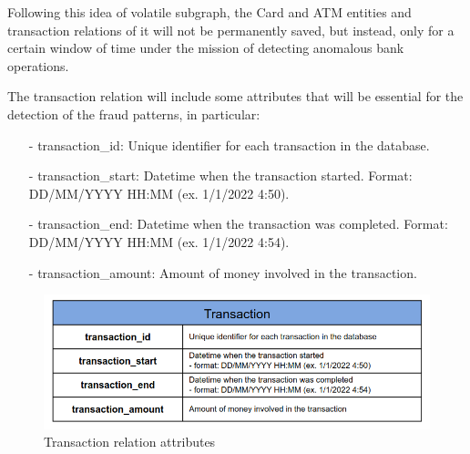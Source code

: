 \documentclass{article}
\begin{document}
Following this idea of volatile subgraph, the Card and ATM entities and transaction relations of it will not be permanently saved, but instead, only for a certain window of time under the mission of detecting anomalous bank operations. 

The transaction relation will include some attributes that will be essential for the detection of the fraud patterns, in particular:

\begin{itemize}
\item[-] transaction\_id: Unique identifier for each transaction in the database.
\item[-] transaction\_start: Datetime when the transaction started. Format: DD/MM/YYYY HH:MM (ex. 1/1/2022 4:50).
\item[-] transaction\_end: Datetime when the transaction was completed. Format: DD/MM/YYYY HH:MM (ex. 1/1/2022 4:54).
\item[-] transaction\_amount: Amount of money involved in the transaction.
\end{itemize}

\begin{figure}[H]
    \centering
    \includegraphics[scale = 0.40]{images/transaction.png}
    \caption{Transaction relation attributes}
    \label{img:pg-stable}
\end{figure}
\end{document}
